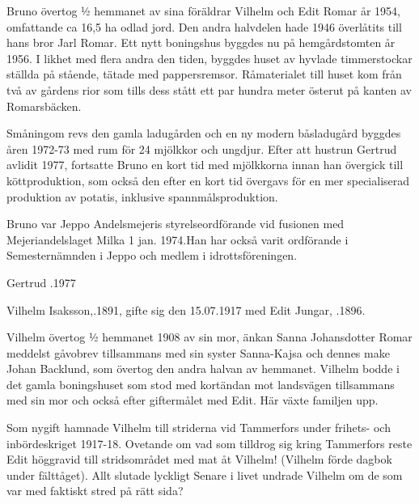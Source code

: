 
 \begin{jhchildren}
   \item {}
   \item {}
   \item {}
   \item {}
 \end{jhchildren}

Bruno övertog ½ hemmanet av sina föräldrar Vilhelm och  Edit Romar år 1954, omfattande ca 16,5 ha odlad jord. Den andra halvdelen hade 1946 överlåtits till hans bror Jarl Romar. Ett nytt boningshus byggdes nu på hemgårdstomten år 1956. I likhet med flera andra den tiden, byggdes huset av hyvlade timmerstockar ställda på stående, tätade med pappersremsor. Råmaterialet till huset kom från två av gårdens rior som tills dess stått ett par hundra meter österut på kanten av Romarsbäcken.

Småningom revs den gamla ladugården och en ny modern båsladugård byggdes åren 1972-73 med rum för 24 mjölkkor och ungdjur. Efter att hustrun Gertrud avlidit 1977, fortsatte Bruno en kort tid med mjölkkorna innan han övergick till köttproduktion, som också den efter en kort tid övergavs för en mer specialiserad produktion av potatis, inklusive spannmålsproduktion.

Bruno var Jeppo Andelsmejeris styrelseordförande vid fusionen med Mejeriandelslaget Milka 1 jan. 1974.Han har också varit ordförande i Semesternämnden i Jeppo och medlem i idrottsföreningen.

Gertrud .1977






Vilhelm Isaksson,.1891, gifte sig den 15.07.1917 med Edit Jungar, .1896.

Vilhelm  övertog  ½ hemmanet 1908 av sin mor, änkan Sanna Johansdotter Romar meddelst gåvobrev tillsammans med sin syster Sanna-Kajsa och dennes make Johan Backlund, som övertog den andra halvan av hemmanet. Vilhelm bodde i det  gamla boningshuset som stod med kortändan mot landsvägen tillsammans med sin mor och också efter giftermålet med Edit. Här växte familjen upp.

Som nygift hamnade Vilhelm till striderna vid Tammerfors under frihets- och inbördeskriget 1917-18. Ovetande om vad som tilldrog sig kring Tammerfors reste Edit höggravid till stridsområdet med mat åt Vilhelm! (Vilhelm förde dagbok under fälttåget). Allt slutade lyckligt Senare i livet undrade Vilhelm om de som var med faktiskt stred på rätt sida?

